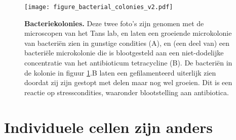 \begin{figure}
    \begin{minipage}[c]{0.5\textwidth}
        \texttt{[image: figure\_bacterial\_colonies\_v2.pdf]}
    \end{minipage}\hfill
    \begin{minipage}[c]{0.5\textwidth}
        \caption{ 
            \textbf{Bacteriekolonies.}
            Deze twee foto's zijn genomen met de microscopen van het Tans lab, en laten een groeiende microkolonie van bacteriën zien in 
            gunstige condities (A), en (een deel van) een bacteriële microkolonie die is blootgesteld aan een niet-dodelijke concentratie van het antibioticum tetracycline (B). De bacteriën in de kolonie in figuur \ref{fig:intro:bacs}.B laten een gefilamenteerd uiterlijk zien doordat zij zijn gestopt met delen maar nog wel groeien. Dit is een reactie op stresscondities, waaronder blootstelling aan antibiotica.
        }
        \label{fig:intro:bacs}
    \end{minipage}
\end{figure}


\section*{Individuele cellen zijn anders}

